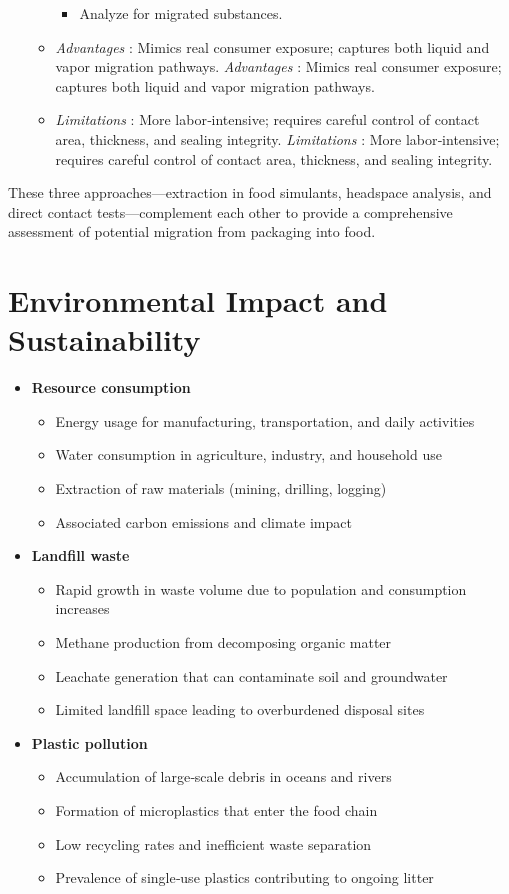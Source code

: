 \documentclass[11pt,a4paper]{article}
\begin{document}
\begin{itemize}
\begin{itemize}
\begin{itemize}
\item Analyze for migrated substances.
    \end{itemize}
\item \textit{Advantages} : Mimics real consumer exposure; captures both liquid and vapor migration pathways.
\textit{Advantages} : Mimics real consumer exposure; captures both liquid and vapor migration pathways.
\item \textit{Limitations} : More labor‑intensive; requires careful control of contact area, thickness, and sealing integrity.
\textit{Limitations} : More labor‑intensive; requires careful control of contact area, thickness, and sealing integrity.
  \end{itemize}
\end{itemize}

These three approaches—extraction in food simulants, headspace analysis, and direct contact tests—complement each other to provide a comprehensive assessment of potential migration from packaging into food.

\section{Environmental Impact and Sustainability}

\begin{itemize}
\item \textbf{Resource consumption}
  \begin{itemize}
\item Energy usage for manufacturing, transportation, and daily activities
\item Water consumption in agriculture, industry, and household use
\item Extraction of raw materials (mining, drilling, logging)
\item Associated carbon emissions and climate impact
  \end{itemize}
\item \textbf{Landfill waste}
  \begin{itemize}
\item Rapid growth in waste volume due to population and consumption increases
\item Methane production from decomposing organic matter
\item Leachate generation that can contaminate soil and groundwater
\item Limited landfill space leading to overburdened disposal sites
  \end{itemize}
\item \textbf{Plastic pollution}
  \begin{itemize}
\item Accumulation of large‑scale debris in oceans and rivers
\item Formation of microplastics that enter the food chain
\item Low recycling rates and inefficient waste separation
\item Prevalence of single‑use plastics contributing to ongoing litter
  \end{itemize}
\end{itemize}
\end{document}
